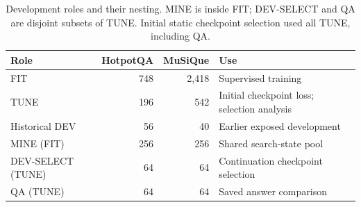 \begin{table}[!htbp]
\centering\small
\caption{Development roles and their nesting. MINE is inside FIT; DEV-SELECT and QA are disjoint subsets of TUNE. Initial static checkpoint selection used all TUNE, including QA.}\label{tab:roles}
\begin{tabular}{@{}p{2.5cm}rrp{5.2cm}@{}}\toprule
Role & HotpotQA & MuSiQue & Use \\
\midrule
FIT & 748 & 2,418 & Supervised training \\
TUNE & 196 & 542 & Initial checkpoint loss; selection analysis \\
Historical DEV & 56 & 40 & Earlier exposed development \\
\addlinespace MINE (FIT) & 256 & 256 & Shared search-state pool \\
DEV-SELECT (TUNE) & 64 & 64 & Continuation checkpoint selection \\
QA (TUNE) & 64 & 64 & Saved answer comparison \\
\bottomrule\end{tabular}
\end{table}
